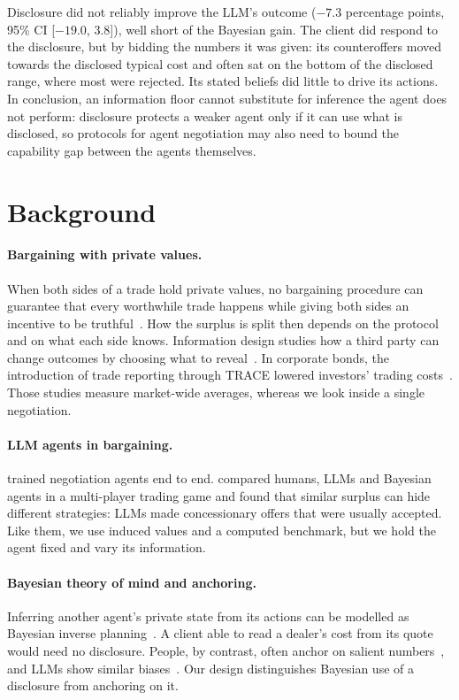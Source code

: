 \documentclass[sigconf]{acmart}
\begin{document}
Disclosure did not reliably improve the LLM's outcome ($-7.3$ percentage points, 95\% CI [$-19.0$, $3.8$]), well short of the Bayesian gain. The client did respond to the disclosure, but by bidding the numbers it was given: its counteroffers moved towards the disclosed typical cost and often sat on the bottom of the disclosed range, where most were rejected. Its stated beliefs did little to drive its actions. In conclusion, an information floor cannot substitute for inference the agent does not perform: disclosure protects a weaker agent only if it can use what is disclosed, so protocols for agent negotiation may also need to bound the capability gap between the agents themselves.


\section{Background}

\paragraph{Bargaining with private values.}
When both sides of a trade hold private values, no bargaining procedure can guarantee that every worthwhile trade happens while giving both sides an incentive to be truthful~\cite{myerson1983efficient}. How the surplus is split then depends on the protocol and on what each side knows. Information design studies how a third party can change outcomes by choosing what to reveal~\cite{kamenica2011bayesian}. In corporate bonds, the introduction of trade reporting through TRACE lowered investors' trading costs~\cite{bessembinder2006market,edwards2007corporate}. Those studies measure market-wide averages, whereas we look inside a single negotiation.

\paragraph{LLM agents in bargaining.}
\citet{lewis2017deal} trained negotiation agents end to end. \citet{qian2026strategic} compared humans, LLMs and Bayesian agents in a multi-player trading game and found that similar surplus can hide different strategies: LLMs made concessionary offers that were usually accepted. Like them, we use induced values and a computed benchmark, but we hold the agent fixed and vary its information.

\paragraph{Bayesian theory of mind and anchoring.}
Inferring another agent's private state from its actions can be modelled as Bayesian inverse planning~\cite{baker2017rational,zhixuan2020online}. A client able to read a dealer's cost from its quote would need no disclosure. People, by contrast, often anchor on salient numbers~\cite{tversky1974judgment}, and LLMs show similar biases~\cite{jones2022capturing}. Our design distinguishes Bayesian use of a disclosure from anchoring on it.
\end{document}
